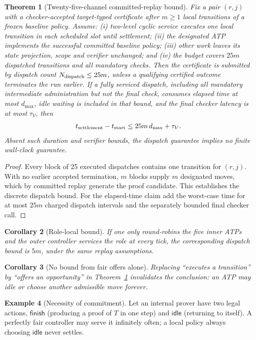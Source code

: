 \documentclass[11pt,letterpaper,oneside]{book}
\newtheorem{theorem}{Theorem}[chapter]
\newtheorem{corollary}[theorem]{Corollary}
\theoremstyle{definition}
\newtheorem{example}[theorem]{Example}
\theoremstyle{remark}
\begin{document}
\begin{theorem}[Twenty-five-channel committed-replay bound]\label{thm:25}
Fix a pair $(r,j)$ with a checker-accepted target-typed certificate
after $m\ge1$ local transitions of a frozen baseline policy. Assume:
(i) two-level cyclic service executes one local transition in each
scheduled slot until settlement; (ii) the designated ATP implements
the successful committed baseline policy; (iii) other work leaves
its state projection, scope and verifier unchanged; and (iv) the
budget covers $25m$ dispatched transitions and all mandatory checks.
Then the certificate is \emph{submitted} by dispatch count
$N_{\rm dispatch}\le25m$, unless a qualifying certified outcome
terminates the run earlier. If a fully serviced dispatch, including
all mandatory intermediate administration but not the final check,
consumes elapsed time at most $d_{\max}$, idle waiting is included in
that bound, and the final checker latency is at most $\tau_V$, then
\[
 t_{\rm settlement}-t_{\rm start}\le25m\,d_{\max}+\tau_V.
\]
Absent such duration and verifier bounds, the dispatch guarantee
implies \emph{no finite wall-clock guarantee}.
\end{theorem}
\begin{proof}
Every block of 25 executed dispatches contains one transition for
$(r,j)$. With no earlier accepted termination, $m$ blocks supply
$m$ designated moves, which by committed replay generate the proof
candidate. This establishes the discrete dispatch bound. For the
elapsed-time claim add the worst-case time for at most $25m$ charged
dispatch intervals and the separately bounded final checker call.
\end{proof}
\begin{corollary}[Role-local bound]
If one only round-robins the five inner ATPs and the outer controller
services the role at every tick, the corresponding dispatch bound is
$5m$, under the same replay assumptions.\end{corollary}
\begin{corollary}[No bound from fair offers alone]
Replacing ``executes a transition'' by ``offers an opportunity'' in
Theorem~\ref{thm:25} invalidates the conclusion: an ATP may idle or
choose another admissible move forever.\end{corollary}

\begin{example}[Necessity of commitment]
Let an internal prover have two legal actions, $\mathsf{finish}$
(producing a proof of $T$ in one step) and $\mathsf{idle}$ (returning
to itself). A perfectly fair controller may serve it infinitely often;
a local policy always choosing $\mathsf{idle}$ never settles.
\end{example}
\end{document}
